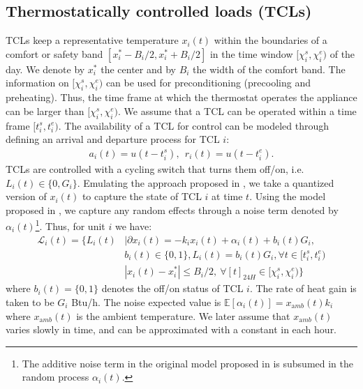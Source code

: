 \documentclass[10pt]{IEEEtran}
\begin{document}
\subsection{Thermostatically controlled loads (TCLs)}\label{cat3}
 TCLs keep a representative temperature $x_i(t)$ within the boundaries of a comfort or safety band $[x^*_i-B_i/2,x_i^*+B_i/2]$ in the time window $[\chi^{s}_i,\chi_i^{e})$ of the day. We denote by $x^*_i$ the center and by $B_i$ the width of the comfort band. The information on $[\chi^{s}_i,\chi_i^{e})$ can be used for preconditioning (precooling and preheating). Thus, the time frame at which the thermostat operates the appliance can be larger than  $[\chi^{s}_i,\chi_i^{e})$. We assume that a TCL can be operated within a time frame $[t^{s}_i,t_i^{e})$. The availability of a TCL for control can be modeled through defining an arrival and departure process for TCL $i$:
\begin{align}
a_i(t) = u(t- t^{s}_i),~~r_i(t) = u(t- t^{e}_i).
\end{align}
TCLs are controlled with a cycling switch that turns them off/on, i.e. $L_i(t) \in \{0,G_i\}$.   Emulating the approach proposed in \cite{chong85}, we take a   quantized version of $x_i(t)$ to capture the state of TCL $i$ at time $t$. 
Using the model proposed in \cite{ihara1981physically}, we capture any random effects through a noise term denoted by $\alpha_i(t)$\footnote{The additive noise term in the original model proposed in \cite{ihara1981physically} is subsumed in the random process $\alpha_i(t)$.}. Thus, for unit $i$ we have:
\begin{align}
{\mathcal L}_i(t)=\Big\{ L_i(t)&|\partial x_i(t)=-k_i x_i(t) +\alpha_i(t)+ b_i(t) G_i,\label{tcls}\\
					& b_i(t)\in \{0,1\}, L_i(t)=b_i(t)G_i, \forall t \in [t_i^s,t_i^e) \nonumber\\
					&|x_i(t)-x^*_i|\leq B_i/2,~  \forall [t]_{24H} \in [\chi_i^s,\chi_i^e)  \Big\}\nonumber
\end{align}
where $b_i(t) = \{0,1\}$ denotes the off/on status of TCL $i$. The rate of heat gain is taken to be $G_i$ Btu/h.
The noise expected value is ${\mathbb E}[\alpha_i(t)]= x_{{\mathrm amb}}(t) k_i$ where $ x_{{\mathrm amb}}(t)$ is the ambient
temperature. We later assume that $x_{{\mathrm amb}}(t)$ varies slowly in time, and can be approximated with a constant in each hour. 
\end{document}
